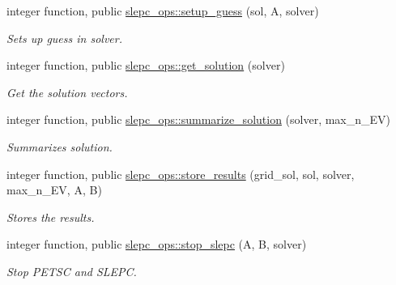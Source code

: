 \begin{DoxyCompactItemize}
integer function, public \hyperlink{namespaceslepc__ops_a46d87cf71b462e3123fa44ede6feb347}{slepc\+\_\+ops\+::setup\+\_\+guess} (sol, A, solver)
\begin{DoxyCompactList}\small\item\em Sets up guess in solver. \end{DoxyCompactList}\item 
integer function, public \hyperlink{namespaceslepc__ops_a35ed6d7de14a758dd6b9c184166fddb7}{slepc\+\_\+ops\+::get\+\_\+solution} (solver)
\begin{DoxyCompactList}\small\item\em Get the solution vectors. \end{DoxyCompactList}\item 
integer function, public \hyperlink{namespaceslepc__ops_acfdc8e5223b9ed95ee0812e7f13e7695}{slepc\+\_\+ops\+::summarize\+\_\+solution} (solver, max\+\_\+n\+\_\+\+EV)
\begin{DoxyCompactList}\small\item\em Summarizes solution. \end{DoxyCompactList}\item 
integer function, public \hyperlink{namespaceslepc__ops_a120efc36444b6b47a57eb06c66a99ea2}{slepc\+\_\+ops\+::store\+\_\+results} (grid\+\_\+sol, sol, solver, max\+\_\+n\+\_\+\+EV, A, B)
\begin{DoxyCompactList}\small\item\em Stores the results. \end{DoxyCompactList}\item 
integer function, public \hyperlink{namespaceslepc__ops_aff3c7a6d15d5bbc4e1dfa20763ce0e61}{slepc\+\_\+ops\+::stop\+\_\+slepc} (A, B, solver)
\begin{DoxyCompactList}\small\item\em Stop P\+E\+T\+SC and S\+L\+E\+PC. \end{DoxyCompactList}\end{DoxyCompactItemize}
